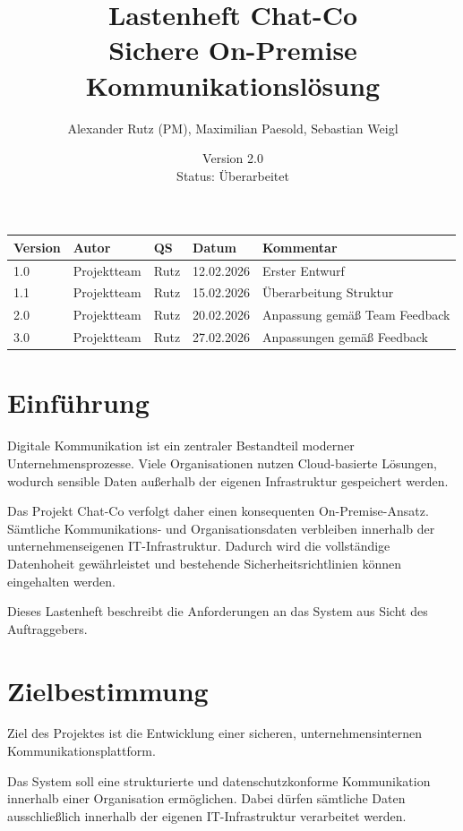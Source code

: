 \documentclass[12pt,a4paper]{extarticle}
\title{
    \textbf{Lastenheft Chat-Co} \\
    \large Sichere On-Premise Kommunikationslösung
}
\author{Alexander Rutz (PM), Maximilian Paesold, Sebastian Weigl}
\date{Version 2.0 \\ Status: Überarbeitet}
\begin{document}
\maketitle

\begin{center}
  \begin{tabular}{|l|l|l|l|l|}
    \hline
    Version & Autor & QS & Datum & Kommentar \\
    \hline
    1.0 & Projektteam & Rutz & 12.02.2026 & Erster Entwurf \\
    \hline
    1.1 & Projektteam & Rutz & 15.02.2026 & Überarbeitung Struktur \\
    \hline
    2.0 & Projektteam & Rutz & 20.02.2026 & Anpassung gemäß Team Feedback \\
    \hline
    3.0 & Projektteam & Rutz & 27.02.2026 & Anpassungen gemäß Feedback\\
    \hline
\end{tabular}
\end{center}

\newpage
\tableofcontents
\newpage


\section{Einführung}

Digitale Kommunikation ist ein zentraler Bestandteil moderner Unternehmensprozesse. Viele Organisationen nutzen Cloud-basierte Lösungen, wodurch sensible Daten außerhalb der eigenen Infrastruktur gespeichert werden.

Das Projekt Chat-Co verfolgt daher einen konsequenten On-Premise-Ansatz. Sämtliche Kommunikations- und Organisationsdaten verbleiben innerhalb der unternehmenseigenen IT-Infrastruktur. Dadurch wird die vollständige Datenhoheit gewährleistet und bestehende Sicherheitsrichtlinien können eingehalten werden.

Dieses Lastenheft beschreibt die Anforderungen an das System aus Sicht des Auftraggebers.

\section{Zielbestimmung}

Ziel des Projektes ist die Entwicklung einer sicheren, unternehmensinternen Kommunikationsplattform.

Das System soll eine strukturierte und datenschutzkonforme Kommunikation innerhalb einer Organisation ermöglichen. Dabei dürfen sämtliche Daten ausschließlich innerhalb der eigenen IT-Infrastruktur verarbeitet werden.
\end{document}

